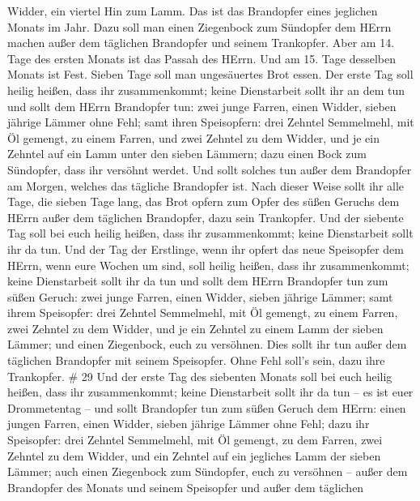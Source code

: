 Widder, ein viertel Hin zum Lamm. Das ist das Brandopfer eines jeglichen
Monats im Jahr.  Dazu soll man einen Ziegenbock zum
Sündopfer dem HErrn machen außer dem täglichen Brandopfer und seinem
Trankopfer.  Aber am 14. Tage des ersten Monats ist das
Passah des HErrn.  Und am 15. Tage desselben Monats ist
Fest. Sieben Tage soll man ungesäuertes Brot essen.  Der
erste Tag soll heilig heißen, dass ihr zusammenkommt; keine Dienstarbeit
sollt ihr an dem tun  und sollt dem HErrn Brandopfer tun:
zwei junge Farren, einen Widder, sieben jährige Lämmer ohne Fehl;
 samt ihren Speisopfern: drei Zehntel Semmelmehl, mit Öl
gemengt, zu einem Farren, und zwei Zehntel zu dem Widder, 
und je ein Zehntel auf ein Lamm unter den sieben Lämmern; 
dazu einen Bock zum Sündopfer, dass ihr versöhnt werdet. 
Und sollt solches tun außer dem Brandopfer am Morgen, welches das
tägliche Brandopfer ist.  Nach dieser Weise sollt ihr alle
Tage, die sieben Tage lang, das Brot opfern zum Opfer des süßen Geruchs
dem HErrn außer dem täglichen Brandopfer, dazu sein Trankopfer.
 Und der siebente Tag soll bei euch heilig heißen, dass ihr
zusammenkommt; keine Dienstarbeit sollt ihr da tun.  Und
der Tag der Erstlinge, wenn ihr opfert das neue Speisopfer dem HErrn,
wenn eure Wochen um sind, soll heilig heißen, dass ihr zusammenkommt;
keine Dienstarbeit sollt ihr da tun  und sollt dem HErrn
Brandopfer tun zum süßen Geruch: zwei junge Farren, einen Widder, sieben
jährige Lämmer;  samt ihrem Speisopfer: drei Zehntel
Semmelmehl, mit Öl gemengt, zu einem Farren, zwei Zehntel zu dem Widder,
 und je ein Zehntel zu einem Lamm der sieben Lämmer;
 und einen Ziegenbock, euch zu versöhnen. 
Dies sollt ihr tun außer dem täglichen Brandopfer mit seinem Speisopfer.
Ohne Fehl soll's sein, dazu ihre Trankopfer. \# 29  Und der
erste Tag des siebenten Monats soll bei euch heilig heißen, dass ihr
zusammenkommt; keine Dienstarbeit sollt ihr da tun -- es ist euer
Drommetentag --  und sollt Brandopfer tun zum süßen Geruch
dem HErrn: einen jungen Farren, einen Widder, sieben jährige Lämmer ohne
Fehl;  dazu ihr Speisopfer: drei Zehntel Semmelmehl, mit Öl
gemengt, zu dem Farren, zwei Zehntel zu dem Widder,  und ein
Zehntel auf ein jegliches Lamm der sieben Lämmer;  auch
einen Ziegenbock zum Sündopfer, euch zu versöhnen --  außer
dem Brandopfer des Monats und seinem Speisopfer und außer dem täglichen

